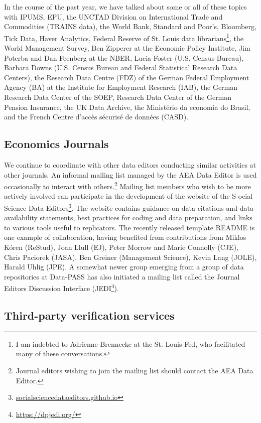 \documentclass[PP]{AEA}
\newcommand{\urlcite}[2]{#2\footnote{\url{#1}}}
\begin{document}
In the course of the past year, we have talked about some or all of these topics with IPUMS, EPU, the UNCTAD Division on International Trade and Commodities (TRAINS data), the World Bank, Standard and Poor's, Bloomberg, Tick Data, Haver Analytics, Federal Reserve of St. Louis data librarians\footnote{I am indebted to  Adrienne Brennecke at the St. Louis Fed, who facilitated many of these conversations.}, the World Management Survey, Ben Zipperer at the Economic Policy Institute, Jim Poterba and Dan Feenberg at the NBER, Lucia Foster (U.S. Census Bureau), Barbara Downs (U.S. Census Bureau and Federal Statistical Research Data Centers), the Research Data Centre (FDZ) of the German Federal Employment Agency (BA) at the Institute for Employment Research (IAB), the German Research Data Center of the SOEP, Research Data Center of the German Pension Insurance, the UK Data Archive, the Ministério da economia do Brasil, and the French Centre d'accès sécurisé de données (CASD). 

\subsection{Economics Journals}

We continue to coordinate with other data editors conducting similar activities at other journals. An informal mailing list managed by the AEA Data Editor is used occasionally to interact with others.\footnote{Journal editors wishing to join the mailing list should contact the AEA Data Editor.} Mailing list members who wish to be more actively involved can participate in the development of the \urlcite{socialsciencedataeditors.github.io}{website of the S ocial Science Data Editors}. The website contains guidance on data citations and data availability statements, best practices for coding and data preparation, and links to various tools useful to replicators. The recently released template README is one example of collaboration, having benefited from contributions from Miklos Kóren (\ac{ReStud}), Joan Llull (\ac{EJ}), Peter Morrow and Marie Connolly (\ac{CJE}), Chris Paciorek (JASA), Ben Greiner (Management Science),  Kevin Lang (JOLE), Harald Uhlig (JPE). A somewhat newer group emerging from a group of data repositories at Data-PASS has also initiated a mailing list called the Journal Editors Discussion Interface (\urlcite{https://dpjedi.org/}{JEDI}).


\subsection{Third-party verification services}
\label{sec:3rdparty}
\end{document}
